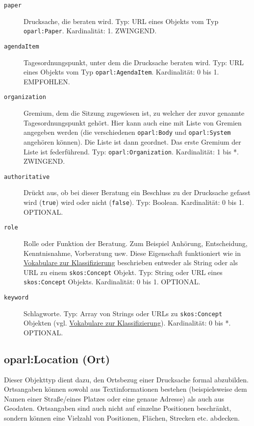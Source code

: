 \documentclass[,a4paper]{article}
\begin{document}
\begin{description}
\item[\texttt{paper}]
Drucksache, die beraten wird. Typ: URL eines Objekts vom Typ
\texttt{oparl:Paper}. Kardinalität: 1. ZWINGEND.
\item[\texttt{agendaItem}]
Tagesordnungspunkt, unter dem die Drucksache beraten wird. Typ: URL
eines Objekts vom Typ \texttt{oparl:AgendaItem}. Kardinalität: 0 bis 1.
EMPFOHLEN.
\item[\texttt{organization}]
Gremium, dem die Sitzung zugewiesen ist, zu welcher der zuvor genannte
Tagesordnungspunkt gehört. Hier kann auch eine mit Liste von Gremien
angegeben werden (die verschiedenen \texttt{oparl:Body} und
\texttt{oparl:System} angehören können). Die Liste ist dann geordnet.
Das erste Gremium der Liste ist federführend. Typ:
\texttt{oparl:Organization}. Kardinalität: 1 bis *. ZWINGEND.
\item[\texttt{authoritative}]
Drückt aus, ob bei dieser Beratung ein Beschluss zu der Drucksache
gefasst wird (\texttt{true}) wird oder nicht (\texttt{false}). Typ:
Boolean. Kardinalität: 0 bis 1. OPTIONAL.
\item[\texttt{role}]
Rolle oder Funktion der Beratung. Zum Beispiel Anhörung, Entscheidung,
Kenntnisnahme, Vorberatung usw. Diese Eigenschaft funktioniert wie in
\hyperref[vokabulareux5fklassifizierung]{Vokabulare zur Klassifizierung}
beschrieben entweder als String oder als URL zu einem
\texttt{skos:Concept} Objekt. Typ: String oder URL eines
\texttt{skos:Concept} Objekts. Kardinalität: 0 bis 1. OPTIONAL.
\item[\texttt{keyword}]
Schlagworte. Typ: Array von Strings oder URLs zu \texttt{skos:Concept}
Objekten (vgl. \hyperref[vokabulareux5fklassifizierung]{Vokabulare zur
Klassifizierung}). Kardinalität: 0 bis *. OPTIONAL.
\end{description}

\subsection{oparl:Location (Ort)}\label{oparlux5flocation}

Dieser Objekttyp dient dazu, den Ortsbezug einer Drucksache formal
abzubilden. Ortsangaben können sowohl aus Textinformationen bestehen
(beispielsweise dem Namen einer Straße/eines Platzes oder eine genaue
Adresse) als auch aus Geodaten. Ortsangaben sind auch nicht auf einzelne
Positionen beschränkt, sondern können eine Vielzahl von Positionen,
Flächen, Strecken etc. abdecken.
\end{document}
